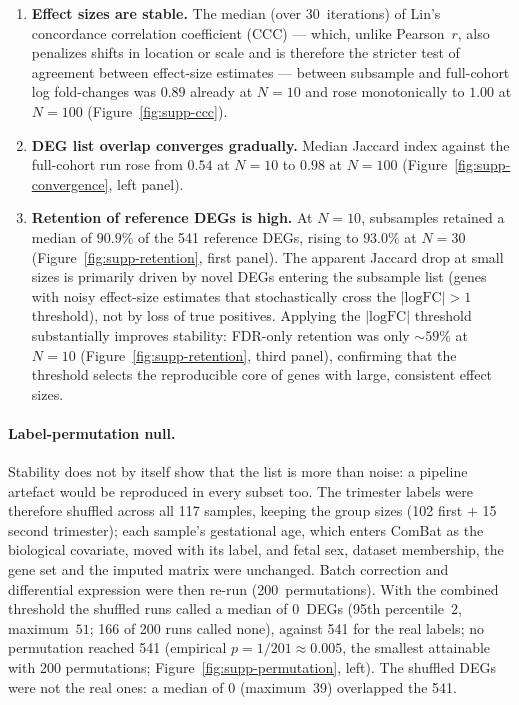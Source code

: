 \documentclass[11pt,a4paper]{article}
\begin{document}
\begin{enumerate}
  \item \textbf{Effect sizes are stable.} The median (over
    30~iterations) of Lin's concordance correlation coefficient
    (CCC) \citep{Lin1989} --- which, unlike Pearson~$r$, also
    penalizes shifts in location or scale and is therefore the
    stricter test of agreement between effect-size estimates ---
    between subsample and full-cohort log fold-changes was $0.89$
    already at $N\!=\!10$ and rose monotonically to $1.00$ at
    $N\!=\!100$ (Figure~\ref{fig:supp-ccc}).
  \item \textbf{DEG list overlap converges gradually.} Median
    Jaccard index against the full-cohort run rose from $0.54$ at
    $N\!=\!10$ to $0.98$ at $N\!=\!100$
    (Figure~\ref{fig:supp-convergence}, left panel).
  \item \textbf{Retention of reference DEGs is high.}
    At $N\!=\!10$, subsamples retained a median of $90.9\%$ of
    the 541 reference DEGs, rising to $93.0\%$ at $N\!=\!30$
    (Figure~\ref{fig:supp-retention}, first panel). The apparent
    Jaccard drop at small sizes is primarily driven by novel
    DEGs entering the subsample list (genes with noisy
    effect-size estimates that stochastically cross the
    $|\text{logFC}|\!>\!1$ threshold), not by loss of true
    positives. Applying the $|\text{logFC}|$ threshold substantially
    improves stability: FDR-only retention was only $\sim\!59\%$ at
    $N\!=\!10$ (Figure~\ref{fig:supp-retention}, third panel), confirming
    that the threshold selects the reproducible core of genes with
    large, consistent effect sizes.
\end{enumerate}

\paragraph{Label-permutation null.}
Stability does not by itself show that the list is more than
noise: a pipeline artefact would be reproduced in every subset
too. The trimester labels were therefore shuffled across all 117
samples, keeping the group sizes (102 first $+$ 15 second
trimester); each sample's gestational age, which enters ComBat as
the biological covariate, moved with its label, and fetal sex,
dataset membership, the gene set and the imputed matrix were
unchanged. Batch correction and differential expression were then
re-run (200~permutations). With the combined threshold the shuffled
runs called a median of $0$~DEGs (95th percentile~$2$,
maximum~$51$; 166 of 200 runs called none), against 541 for the
real labels; no permutation reached 541 (empirical
$p = 1/201 \approx 0.005$, the smallest attainable with 200
permutations; Figure~\ref{fig:supp-permutation}, left). The
shuffled DEGs were not the real ones: a median of 0 (maximum~39)
overlapped the 541.
\end{document}
